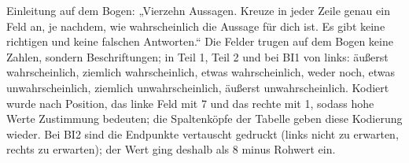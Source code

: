 Einleitung auf dem Bogen: „Vierzehn Aussagen. Kreuze in jeder Zeile genau ein Feld an, je nachdem, wie wahrscheinlich die Aussage für dich ist. Es gibt keine richtigen und keine falschen Antworten.“ Die Felder trugen auf dem Bogen keine Zahlen, sondern Beschriftungen; in Teil 1, Teil 2 und bei BI1 von links: äußerst wahrscheinlich, ziemlich wahrscheinlich, etwas wahrscheinlich, weder noch, etwas unwahrscheinlich, ziemlich unwahrscheinlich, äußerst unwahrscheinlich. Kodiert wurde nach Position, das linke Feld mit 7 und das rechte mit 1, sodass hohe Werte Zustimmung bedeuten; die Spaltenköpfe der Tabelle geben diese Kodierung wieder. Bei BI2 sind die Endpunkte vertauscht gedruckt (links nicht zu erwarten, rechts zu erwarten); der Wert ging deshalb als 8 minus Rohwert ein.

\begingroup
\footnotesize
\setlength{\tabcolsep}{3pt}
\renewcommand{\arraystretch}{1.15}
\setlength{\LTcapwidth}{\textwidth}
